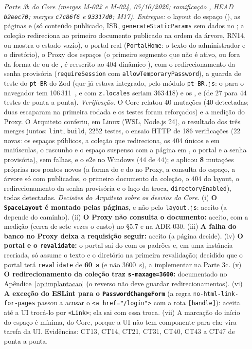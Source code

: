 \emph{Parte 3b do Core (merges M-022 e M-024, 05/10/2026; ramificação , HEAD \texttt{b2eec70}; merges \texttt{c7c86f6} e \texttt{93317d0}; M17).} \emph{Entregue:} o layout do espaço (), as páginas \arq{/[handle]} e \arq{/[handle]/[...slug]} (só conteúdo publicado, ISR, \texttt{generateStaticParams} sem dados no ; a coleção redireciona ao primeiro documento publicado na ordem da árvore, RN14, ou mostra o estado vazio), o portal real (\texttt{PortalHome}: o texto do administrador e o diretório), o Proxy dos espaços (o primeiro segmento que não é  ativo, ou fora da forma de  ou de , é reescrito ao 404 dinâmico ),  com o redirecionamento da senha provisória (\texttt{requireSession} com \texttt{allowTemporaryPassword}), a guarda de teste do \texttt{pt-BR} do Zod (que já estava integrado, pelo módulo \texttt{pt-BR.js}: o  para o navegador tem 106\,311~, e com \texttt{z.locales} seriam 363\,418) e os  ,  e  (de 27 para 44 testes de ponta a ponta). \emph{Verificação.} O Core relatou 40 mutações (40 detectadas; duas escaparam na primeira rodada e os testes foram reforçados) e a medição do Proxy. O Arquiteto conferiu, em Linux (WSL, Node.js 24), o resultado dos três merges juntos: \texttt{lint}, \texttt{build}, 2252 testes, o ensaio HTTP de 186 verificações (22 novas: os espaços públicos, a coleção que redireciona, os 404 únicos e em maiúsculas, o rascunho e o espaço suspenso com a página em , o portal e a senha provisória), sem falhas, e o e2e no Windows (44 de 44); e aplicou \textbf{8} mutações próprias nos pontos novos (a forma do  e do  no Proxy, a consulta do espaço, a árvore só com publicados, o primeiro documento da coleção, o 404 do layout, o redirecionamento da senha provisória e o laço da troca, \texttt{directoryEnabled}), todas detectadas. \emph{Decisões do Arquiteto sobre os desvios do Core.} (i) \textbf{O \texttt{SpaceLayout} é montado pelas páginas}, e não pelo \texttt{layout.js}: aceito (a  depende do caminho). (ii) \textbf{O Proxy não consulta o documento:} aceito, com a medição (cerca de sete vezes o custo) no \S5.7 e na ADR-030. (iii) \textbf{A falha do banco no Proxy deixa a requisição seguir:} aceito (a página decide). (iv) \textbf{O portal e o \texttt{revalidate}:} o portal sai do  com os padrões e, em uma instância recriada, só assume o texto e o diretório na primeira revalidação; decidido que o portal terá \texttt{revalidate} de \textbf{60~s} (e não 3600~s), a implementar na Parte 3c. (v) \textbf{O redirecionamento da coleção traz \texttt{s-maxage=3600}:} documentado no Apêndice~\ref{ap:implantacao} (o  reverso não deve guardar redirecionamentos). (vi) \textbf{A exceção do ESLint para o \texttt{PasswordChangeForm}} (a regra \texttt{no-html-link-for-pages} passou a acusar o \texttt{<a href="/login">} com a rota \texttt{[handle]}): aceita até a UI trocá-lo por \texttt{<Link>}; ela sai com essa troca. (vii) A marcação do início do espaço é mínima, do Core, porque a UI não tem componente para ela: vira tarefa da UI. Evidências: CT13, CT14, CT21, CT31, CT40, CT43 a CT47 de ponta a ponta.

